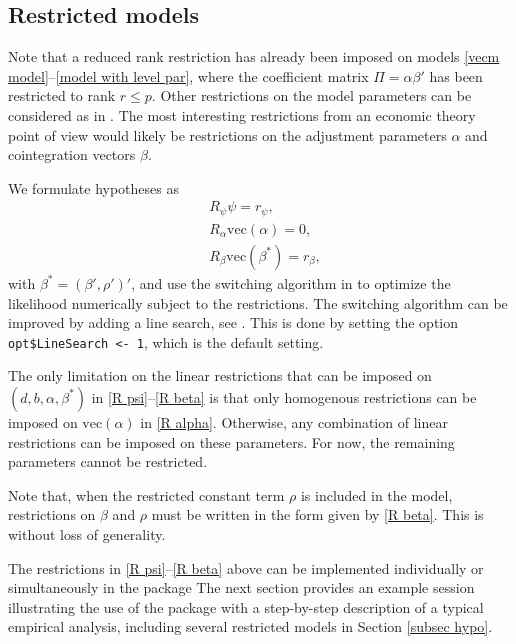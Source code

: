 \documentclass[article]{jss}
\begin{document}
\subsection{Restricted models}
\label{restricted models}

Note that a reduced rank restriction has already been imposed on models \eqref{vecm model}--\eqref{model with level par}, where the coefficient matrix $\Pi  = \alpha \beta '$ has been restricted to rank $r \leq p$. Other restrictions on the model parameters can be considered as in \cite{Johansen1995}. The most interesting restrictions from an economic theory point of view would likely be restrictions on the adjustment parameters $\alpha$ and cointegration vectors $\beta$.

We formulate hypotheses as
\begin{align}
  &R_{\psi} \psi = r_{\psi}, \label{R psi} \\
  &R_\alpha \mathrm{vec}(\alpha) = 0, \label{R alpha} \\
  &R_\beta \mathrm{vec}(\beta^{\ast}) = r_\beta, \label{R beta}
\end{align}
with $\beta^{\ast} = (\beta', \rho')'$, and use the switching algorithm in \cite[p.\ 455]{Boswijk2004} to optimize the likelihood numerically subject to the restrictions. The switching algorithm can be improved by adding a line search, see \cite{Doornik2016}. This is done by setting the option \verb|opt$LineSearch <- 1|, which is the default setting.

The only limitation on the linear restrictions that can be imposed on $(d,b,\alpha,\beta^{\ast})$ in \eqref{R psi}--\eqref{R beta} is that only homogenous restrictions can be imposed on $\mathrm{vec}(\alpha)$ in \eqref{R alpha}. Otherwise, any combination of linear restrictions can be imposed on these parameters. For now, the remaining parameters cannot be restricted.

Note that, when the restricted constant term $\rho$ is included in the model, restrictions on $\beta$ and $\rho$ must be written in the form given by \eqref{R beta}. This is without loss of generality.

The restrictions in \eqref{R psi}--\eqref{R beta} above can be implemented individually or simultaneously 
in the  package %
The next section provides an example session illustrating the use of the package with a step-by-step description of a typical empirical analysis, including several restricted models in Section \ref{subsec hypo}.
\end{document}
